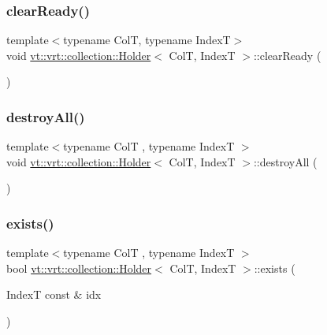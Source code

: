 \mbox{\label{structvt_1_1vrt_1_1collection_1_1_holder_a2a16bdae9bb011c1f32cd1cbf4a93f55}} 
\subsubsection{\texorpdfstring{clear\+Ready()}{clearReady()}}
{\footnotesize\ttfamily template$<$typename ColT, typename IndexT$>$ \\
void \hyperlink{structvt_1_1vrt_1_1collection_1_1_holder}{vt\+::vrt\+::collection\+::\+Holder}$<$ ColT, IndexT $>$\+::clear\+Ready (\begin{DoxyParamCaption}{ }\end{DoxyParamCaption})\hspace{0.3cm}{\ttfamily [inline]}}

\mbox{\label{structvt_1_1vrt_1_1collection_1_1_holder_ae4bd4f8f82713c8b4b2ea0b472fe7192}} 
\subsubsection{\texorpdfstring{destroy\+All()}{destroyAll()}}
{\footnotesize\ttfamily template$<$typename ColT , typename IndexT $>$ \\
void \hyperlink{structvt_1_1vrt_1_1collection_1_1_holder}{vt\+::vrt\+::collection\+::\+Holder}$<$ ColT, IndexT $>$\+::destroy\+All (\begin{DoxyParamCaption}{ }\end{DoxyParamCaption})}

\mbox{\label{structvt_1_1vrt_1_1collection_1_1_holder_a15b1f2f386c124191f01400fecf24464}} 
\subsubsection{\texorpdfstring{exists()}{exists()}}
{\footnotesize\ttfamily template$<$typename ColT , typename IndexT $>$ \\
bool \hyperlink{structvt_1_1vrt_1_1collection_1_1_holder}{vt\+::vrt\+::collection\+::\+Holder}$<$ ColT, IndexT $>$\+::exists (\begin{DoxyParamCaption}\item[{IndexT const \&}]{idx }\end{DoxyParamCaption})}

